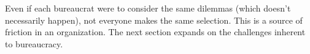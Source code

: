 Even if each bureaucrat were to consider the same dilemmas (which doesn't necessarily happen), not everyone makes the same selection. This is a source of friction in an organization. The next section expands on the  challenges inherent to bureaucracy. 

